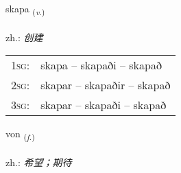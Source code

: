 \documentclass[frontgrid, backgrid]{flacards}\usepackage[]{graphicx}\usepackage[]{xcolor}
\begin{document}
\renewcommand{\flhead}{\vskip5pt \fboxsep=0pt {\small\bfseries\footnotesize Sagnorð | 动词}}
\renewcommand{\fcfoot}{\vskip5pt \fboxsep=0pt \hspace{2pt}{\small\bfseries\footnotesize 1K}}

\renewcommand{\blhead}{\vskip5pt {\small\bfseries\footnotesize Sagnorð | 动词 }}
\renewcommand{\bcfoot}{\vskip5pt \hspace{2pt}{\small\bfseries\footnotesize 1K}}


{skapa \small{\textsubscript{(\textit{v.})}} \\[1ex] %
\textphonetic{[skaːpa]} \\
zh.: \emph{创建} \\  [2ex]
\renewcommand*{\arraystretch}{0.8}
\begin{tabular}{p{1cm}l}
\textsc{1sg}: & skapa -- skapaði -- skapað \\ 
\textsc{2sg}: & skapar -- skapaðir -- skapað \\ 
\textsc{3sg}: & skapar -- skapaði -- skapað \\ 
\end{tabular}
}

\renewcommand{\flhead}{\vskip5pt \fboxsep=0pt {\small\bfseries\footnotesize Nafnorð | 名词}}
\renewcommand{\fcfoot}{\vskip5pt \fboxsep=0pt \hspace{2pt}{\small\bfseries\footnotesize 1K}}

\renewcommand{\blhead}{\vskip5pt {\small\bfseries\footnotesize Nafnorð | 名词 }}
\renewcommand{\bcfoot}{\vskip5pt \hspace{2pt}{\small\bfseries\footnotesize 1K}}


{von \small{\textsubscript{(\textit{f.})}} \\[1ex] %
\textphonetic{[vɔːn]} \\
zh.: \emph{希望；期待} \\  [2ex]
\renewcommand*{\arraystretch}{0.8}
}
\end{document}
